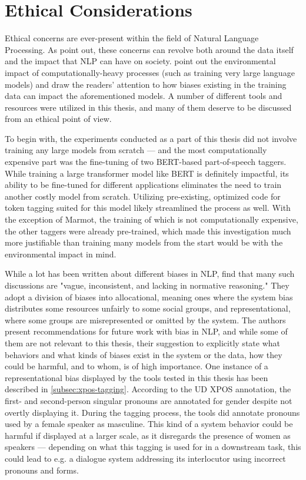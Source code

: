 \section{Ethical Considerations}
\label{sec:ethicalcons}

Ethical concerns are ever-present within the field of Natural Language Processing. As \citet{hovy-spruit-2016-social} point out, these concerns can revolve both around the data itself and the impact that NLP can have on society. \citet{stochastic-parrots} point out the environmental impact of computationally-heavy processes (such as training very large language models) and draw the readers' attention to how biases existing in the training data can impact the aforementioned models. A number of different tools and resources were utilized in this thesis, and many of them deserve to be discussed from an ethical point of view.

To begin with, the experiments conducted as a part of this thesis did not involve training any large models from scratch --- and the most computationally expensive part was the fine-tuning of two BERT-based part-of-speech taggers. While training a large transformer model like BERT is definitely impactful, its ability to be fine-tuned for different applications eliminates the need to train another costly model from scratch. Utilizing pre-existing, optimized code for token tagging suited for this model likely streamlined the process as well. With the exception of Marmot, the training of which is not computationally expensive, the other taggers were already pre-trained, which made this investigation much more justifiable than training many models from the start would be with the environmental impact in mind. 

While a lot has been written about different biases in NLP, \citet{blodgett-etal-2020-language} find that many such discussions are "vague, inconsistent, and lacking in normative reasoning." They adopt a division of biases into allocational, meaning ones where the system bias distributes some resources unfairly to some social groups, and representational, where some groups are misrepresented or omitted by the system. The authors present recommendations for future work with bias in NLP, and while some of them are not relevant to this thesis, their suggestion to explicitly state what behaviors and what kinds of biases exist in the system or the data, how they could be harmful, and to whom, is of high importance. One instance of a representational bias displayed by the tools tested in this thesis has been described in \autoref{subsec:xpos-tagging}. According to the UD XPOS annotation, the first- and second-person singular pronouns are annotated for gender despite not overtly displaying it. During the tagging process, the tools did annotate pronouns used by a female speaker as masculine. This kind of a system behavior could be harmful if displayed at a larger scale, as it disregards the presence of women as speakers --- depending on what this tagging is used for in a downstream task, this could lead to e.g. a dialogue system addressing its interlocutor using incorrect pronouns and forms. 

